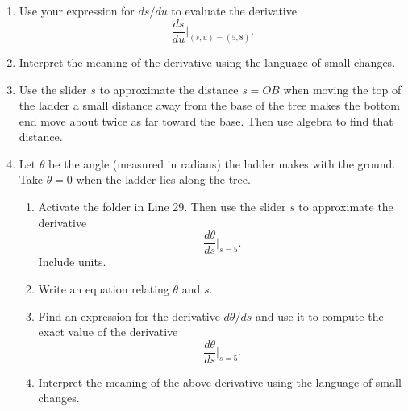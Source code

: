\documentclass{ximera}
\begin{document}
\begin{question}
\begin{enumerate}
\item Use your expression for $ds/du$ to evaluate the derivative
\[
\frac{ds}{du}\Big|_{(s,u) = (5,8)} .
\]

\item Interpret the meaning of the derivative using the language of small changes.

\item Use the slider $s$ to approximate the distance $s=OB$ when moving the top of the ladder a small distance away from the base of the tree makes the bottom end move about twice as far toward the base. Then use algebra to find that distance.

\item Let $\theta$ be the angle (measured in radians) the ladder makes with the ground. Take $\theta=0$ when the ladder lies along the tree.

\begin{enumerate}
\item Activate the folder in Line 29. Then use the slider $s$ to approximate the derivative 
\[
\frac{d\theta}{ds}\Big|_{s=5} .
\]
Include units.

\item Write an equation relating $\theta$ and $s$.

\item Find an expression for the derivative $d\theta/ds$ and use it to compute the exact value of the derivative
\[
\frac{d\theta}{ds}\Big|_{s=5} .
\]

\item Interpret the meaning of the above derivative using the language of small changes.

\end{enumerate}



\end{enumerate}

\end{question}
\end{document}
